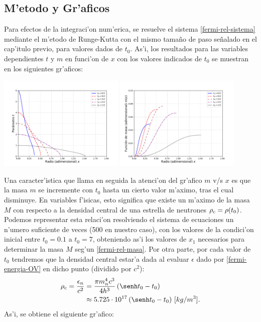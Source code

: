 \subsection{M'etodo y Gr'aficos}
Para efectos de la integraci'on num'erica, se resuelve el sistema \eqref{fermi-rel-sistema} mediante el m'etodo de Runge-Kutta con el mismo tama\~no de paso se\~nalado en el cap'itulo previo, para valores dados de $t_0$. As'i, los resultados para las variables dependientes $t$ y $m$ en funci'on de $x$ con los valores indicados de $t_0$ se muestran en los siguientes gr'aficos:

\begin{multicols}{2}
\includegraphics[angle=0,width=0.45\textwidth]{fig/fig-fermi-rel-t-x.pdf}
\includegraphics[angle=0,width=0.45\textwidth]{fig/fig-fermi-rel-m-x.pdf}
\end{multicols}

Una caracter'istica que llama en seguida la atenci'on del gr'afico $m$ v/s $x$ es que la masa $m$ se incremente con $t_0$ hasta un cierto valor m'aximo, tras el cual disminuye. En variables f'isicas, esto significa que existe un m'aximo de la masa $M$ con respecto a la densidad central de una estrella de neutrones $\rho_{\rm c}=\rho(t_0)$. Podemos representar esta relaci'on resolviendo el sistema de ecuaciones un n'umero suficiente de veces (500 en nuestro caso), con los valores de la condici'on inicial entre $t_0=0.1$ a $t_0=7$, obteniendo as'i los valores de $x_1$ necesarios para determinar la masa $M$ seg'un \eqref{fermi-rel-masa}. Por otra parte, por cada valor de $t_0$ tendremos que la densidad central estar'a dada al evaluar $\epsilon$ dado por \eqref{fermi-energia-OV} en dicho punto (dividido por $c^2$):
\begin{align}
\rho_{\rm c}=\frac{\epsilon_{n}}{c^2}&=\frac{\pi m_{n}^4c^3}{4h^3}\left(\senh t_0-t_0\right)\\
&\approx5.725\cdot10^{17}\left(\senh t_0-t_0\right)\,[kg/m^3].
\end{align}
As'i, se obtiene el siguiente gr'afico:

